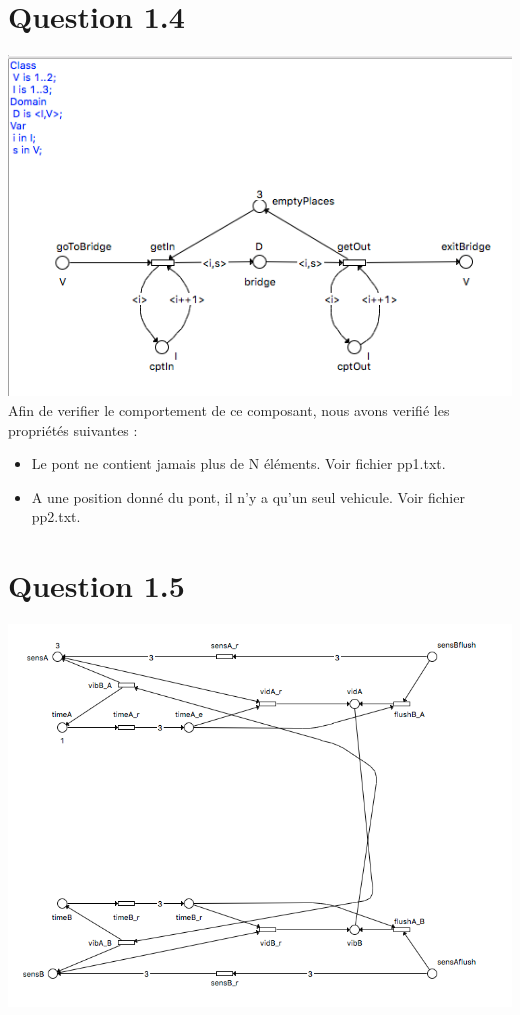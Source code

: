 \documentclass[a4paper, 11pt]{article}
\begin{document}
\section{Question 1.4}
\includegraphics[scale=0.35]{P.png}
Afin de verifier le comportement de ce composant, nous avons verifié les propriétés suivantes :
\begin{itemize}
\item Le pont ne contient jamais plus de N éléments. Voir fichier pp1.txt.
\item A une position donné du pont, il n'y a qu'un seul vehicule. Voir fichier pp2.txt.
\end{itemize}

\section{Question 1.5}
\includegraphics[scale=0.35]{CTRLP.png}
\end{document}
